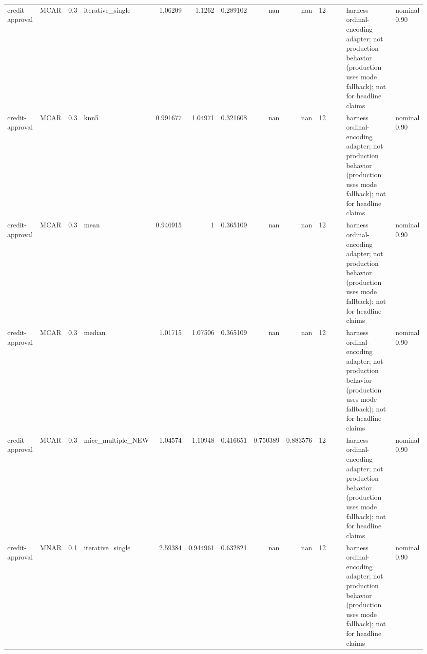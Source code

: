 \begin{table}[ht]
\begin{tabular}{llrlrrrrrrllll}
 credit-approval      & MCAR        &         0.3 & iterative\_single  &       1.06209  &             1.1262   &                 0.289102 &                     nan        &                       nan        &        12 &                    &                                         & harness ordinal-encoding adapter; not production behavior (production uses mode fallback); not for headline claims & nominal 0.90              \\
 credit-approval      & MCAR        &         0.3 & knn5              &       0.991677 &             1.04971  &                 0.321608 &                     nan        &                       nan        &        12 &                    &                                         & harness ordinal-encoding adapter; not production behavior (production uses mode fallback); not for headline claims & nominal 0.90              \\
 credit-approval      & MCAR        &         0.3 & mean              &       0.946915 &             1        &                 0.365109 &                     nan        &                       nan        &        12 &                    &                                         & harness ordinal-encoding adapter; not production behavior (production uses mode fallback); not for headline claims & nominal 0.90              \\
 credit-approval      & MCAR        &         0.3 & median            &       1.01715  &             1.07506  &                 0.365109 &                     nan        &                       nan        &        12 &                    &                                         & harness ordinal-encoding adapter; not production behavior (production uses mode fallback); not for headline claims & nominal 0.90              \\
 credit-approval      & MCAR        &         0.3 & mice\_multiple\_NEW &       1.04574  &             1.10948  &                 0.416651 &                       0.750389 &                         0.883576 &        12 &                    &                                         & harness ordinal-encoding adapter; not production behavior (production uses mode fallback); not for headline claims & nominal 0.90              \\
 credit-approval      & MNAR        &         0.1 & iterative\_single  &       2.59384  &             0.944961 &                 0.632821 &                     nan        &                       nan        &        12 &                    &                                         & harness ordinal-encoding adapter; not production behavior (production uses mode fallback); not for headline claims & nominal 0.90              \\

\end{tabular}
\end{table}

